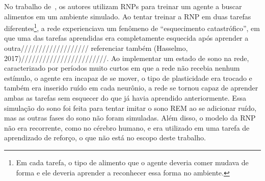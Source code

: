 No trabalho de~, os autores utilizam RNPs para treinar um agente a buscar alimentos em um ambiente
simulado. Ao tentar treinar a RNP em duas tarefas diferentes\footnote{Em cada tarefa, o tipo de alimento que o agente deveria
comer mudava de forma e ele deveria aprender a reconhecer essa forma no ambiente.}, a rede experienciava um fenômeno de
``esquecimento catastrófico'', em que uma das tarefas aprendidas era completamente esquecida após aprender a
outra/////////////////// referenciar também (Hasselmo, 2017)////////////////////////. Ao implementar um estado de sono na rede,
caracterizado por períodos muito curtos em que a rede não recebia nenhum estímulo, o agente era incapaz de se mover, o tipo de
plasticidade era trocado e também era inserido ruído em cada neurônio, a rede se tornou capaz de aprender ambas as tarefas sem
esquecer do que já havia aprendido anteriormente. Essa simulação do sono foi feita para tentar imitar o sono REM ao se adicionar
ruído, mas as outras fases do sono não foram simuladas. Além disso, o modelo da RNP não era recorrente, como no cérebro humano, e
era utilizado em uma tarefa de aprendizado de reforço, o que não está no escopo deste trabalho.

